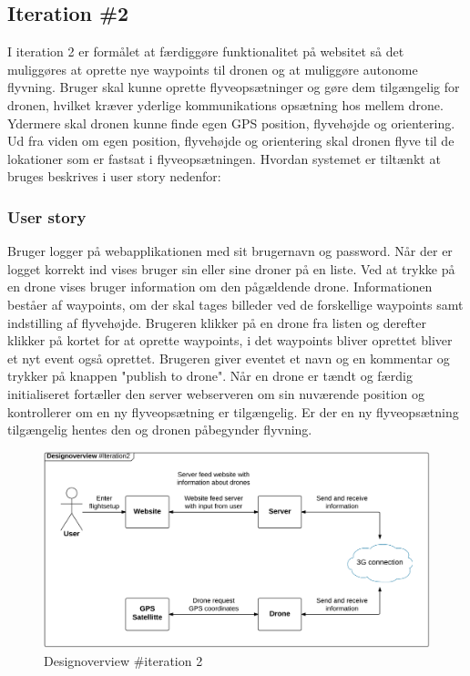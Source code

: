 \subsection{Iteration \#2}
I iteration 2 er formålet at færdiggøre funktionalitet på websitet så det muliggøres at oprette nye waypoints til dronen og at muliggøre autonome flyvning. Bruger skal kunne oprette flyveopsætninger og gøre dem tilgængelig for dronen, hvilket kræver yderlige kommunikations opsætning hos mellem drone. Ydermere skal dronen kunne finde egen GPS position, flyvehøjde og orientering. Ud fra viden om egen position, flyvehøjde og orientering skal dronen flyve til de lokationer som er fastsat i flyveopsætningen. 
Hvordan systemet er tiltænkt at bruges beskrives i user story nedenfor:

\subsubsection*{User story}
Bruger logger på webapplikationen med sit brugernavn og password. Når der er logget korrekt ind vises bruger sin eller sine droner på en liste. Ved at trykke på en drone vises bruger information om den pågældende drone. Informationen beståer af waypoints, om der skal tages billeder ved de forskellige waypoints samt indstilling af flyvehøjde. Brugeren klikker på en drone fra listen og derefter klikker på kortet for at oprette waypoints, i det waypoints bliver oprettet bliver et nyt event også oprettet. Brugeren giver eventet et navn og en kommentar og trykker på knappen "publish to drone".
Når en drone er tændt og færdig initialiseret fortæller den server webserveren om sin nuværende position og kontrollerer om en ny flyveopsætning er tilgængelig. Er der en ny flyveopsætning tilgængelig hentes den og dronen påbegynder flyvning.

\begin{figure}[H]
	\centering
	\includegraphics[width=1\textwidth]{Billeder/design_overview/design_overview_iteration2.png}
	\vspace{-.5cm}
	\caption{Designoverview \#iteration 2}
	\label{fig:design_overview_UC1}
\end{figure}



